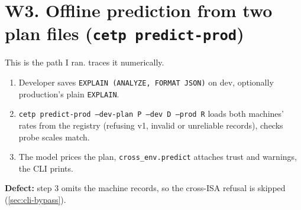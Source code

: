 \section{W3. Offline prediction from two plan files (\texttt{cetp predict-prod})}
This is the path I ran.  traces it numerically.
\begin{enumerate}
\item Developer saves \texttt{EXPLAIN (ANALYZE, FORMAT JSON)} on dev, optionally production's plain \texttt{EXPLAIN}.
\item \texttt{cetp predict-prod --dev-plan P --dev D --prod R} loads both machines' rates from the registry
 (refusing v1, invalid or unreliable records), checks probe scales match.
\item The model prices the plan, \texttt{cross\_env.predict} attaches trust and warnings, the CLI prints.
\end{enumerate}
\textbf{Defect:} step 3 omits the machine records, so the cross-ISA refusal is skipped (\cref{sec:cli-bypass}).


